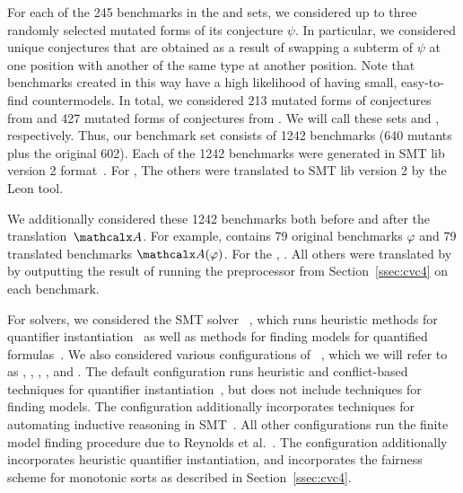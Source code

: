 For each of the 245 benchmarks in the \isa and \leon sets, 
we considered up to three randomly selected
mutated forms of its conjecture $\psi$. In particular, we considered unique
conjectures that are obtained as a result of swapping a subterm of $\psi$ at
one position with another of the same type at another position.
Note that benchmarks created in this way have a high likelihood of having
small, easy-to-find countermodels. In total, we considered 213 mutated forms of
conjectures from \isa and 427 mutated forms of conjectures from \leon. We will
call these sets \isam and \leonm, respectively.
Thus, our benchmark set consists of 1242 benchmarks (640 mutants plus the
original 602). 
Each of the 1242 benchmarks were generated in SMT lib version 2 format~\cite{}.
For \isanun, 
The others were translated to SMT lib version 2 by the Leon tool.

We additionally considered these 1242 benchmarks both before and after the translation~$\conv$.
For example, \isa contains 79 original benchmarks $\varphi$ and 79 translated
benchmarks $\conv(\varphi)$.
For the \isanun, .
All others were translated by \cvc 
by outputting the result of running the preprocessor from Section~\ref{ssec:cvc4} on each benchmark.

For solvers, we considered the SMT solver \ziii~\cite{de-moura-bjoerner-2008},
which runs heuristic methods for quantifier instantiation~\cite{MouraBjoerner07}
as well as methods for finding models for quantified formulas~\cite{GeDeM-CAV-09}.
We also considered various configurations of \cvc~\cite{barrett-et-al-2011},
which we will refer to as \cvcd, \cvci, \cvcf, \cvcfe, and \cvcfm.
The default configuration \cvcd runs heuristic 
and conflict-based techniques for quantifier instantiation~\cite{ReynoldsTinelliMoura14},
but does not include techniques for finding models.
The configuration \cvci additionally incorporates techniques for automating inductive
reasoning in SMT~\cite{reynolds-kuncak-2015}.
All other configurations run the finite model
finding procedure due to Reynolds et al.\ \cite{ReyEtAl-1-RR-13,reynolds-et-al-2013}.
The configuration \cvcfe additionally incorporates heuristic quantifier instantiation,
and \cvcfm incorporates the fairness scheme for monotonic sorts as described in Section~\ref{ssec:cvc4}.

